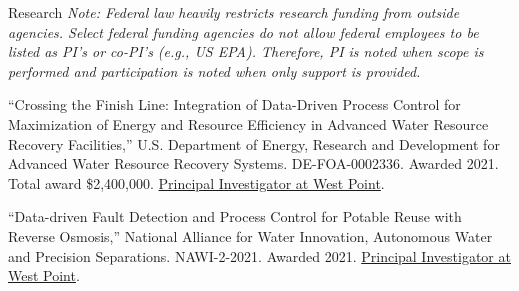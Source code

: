 \documentclass{resume} %
\begin{document}
\begin{rSection}{Research}
\emph{Note: Federal law heavily restricts research funding from outside agencies. Select federal funding agencies do not allow federal employees to be listed as PI's or co-PI's (e.g., US EPA). Therefore, PI is noted when scope is performed and participation is noted when only support is provided.}

``Crossing the Finish Line: Integration of Data-Driven Process Control for Maximization of Energy and Resource Efficiency in Advanced Water Resource Recovery Facilities,'' U.S. Department of Energy, Research and Development for Advanced Water Resource Recovery Systems. DE-FOA-0002336. Awarded 2021. Total award \$2,400,000. \ul{Principal Investigator at West Point}.

``Data-driven Fault Detection and Process Control for Potable Reuse with Reverse Osmosis,'' National Alliance for Water Innovation, Autonomous Water and Precision Separations. NAWI-2-2021. Awarded 2021. \ul{Principal Investigator at West Point}.
\end{rSection}


\end{document}
